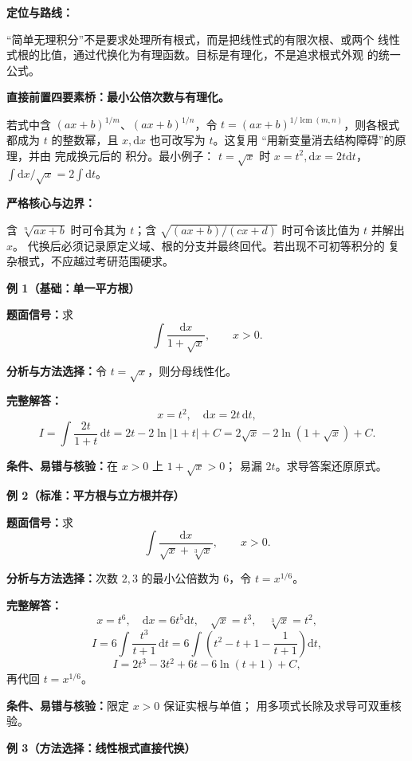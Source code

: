 \begin{knowledgeBox}
\textbf{定位与路线：}

“简单无理积分”不是要求处理所有根式，而是把线性式的有限次根、或两个
线性式根的比值，通过代换化为有理函数。目标是有理化，不是追求根式外观
的统一公式。

\textbf{直接前置四要素桥：最小公倍次数与有理化。}

若式中含 \((ax+b)^{1/m}\)、\((ax+b)^{1/n}\)，令
\(t=(ax+b)^{1/\operatorname{lcm}(m,n)}\)，则各根式都成为 \(t\)
的整数幂，且 \(x,\mathrm dx\) 也可改写为 \(t\)。这复用
“用新变量消去结构障碍”的原理，并由
完成换元后的
积分。最小例子：
\(t=\sqrt x\) 时 \(x=t^2,\mathrm dx=2t\mathrm dt\)，
\(\int\mathrm dx/\sqrt x=2\int\mathrm dt\)。

\textbf{严格核心与边界：}

含 \(\sqrt[n]{ax+b}\) 时可令其为 \(t\)；含
\(\sqrt{(ax+b)/(cx+d)}\) 时可令该比值为 \(t\) 并解出 \(x\)。
代换后必须记录原定义域、根的分支并最终回代。若出现不可初等积分的
复杂根式，不应越过考研范围硬求。

\textbf{例 1（基础：单一平方根）}

\textbf{题面信号：}求
\[
\int\frac{\mathrm dx}{1+\sqrt x},\qquad x>0.
\]

\textbf{分析与方法选择：}令 \(t=\sqrt x\)，则分母线性化。

\textbf{完整解答：}
\[
x=t^2,\quad \mathrm dx=2t\,\mathrm dt,
\]
\[
I=\int\frac{2t}{1+t}\,\mathrm dt
=2t-2\ln|1+t|+C
=2\sqrt x-2\ln(1+\sqrt x)+C.
\]

\textbf{条件、易错与核验：}在 \(x>0\) 上 \(1+\sqrt x>0\)；
易漏 \(2t\)。求导答案还原原式。

\textbf{例 2（标准：平方根与立方根并存）}

\textbf{题面信号：}求
\[
\int\frac{\mathrm dx}{\sqrt x+\sqrt[3]x},\qquad x>0.
\]

\textbf{分析与方法选择：}次数 \(2,3\) 的最小公倍数为 \(6\)，令
\(t=x^{1/6}\)。

\textbf{完整解答：}
\[
x=t^6,\quad \mathrm dx=6t^5\mathrm dt,\quad
\sqrt x=t^3,\quad\sqrt[3]x=t^2,
\]
\[
I=6\int\frac{t^3}{t+1}\,\mathrm dt
=6\int\left(t^2-t+1-\frac1{t+1}\right)\mathrm dt,
\]
\[
I=2t^3-3t^2+6t-6\ln(t+1)+C,
\]
再代回 \(t=x^{1/6}\)。

\textbf{条件、易错与核验：}限定 \(x>0\) 保证实根与单值；
用多项式长除及求导可双重核验。

\textbf{例 3（方法选择：线性根式直接代换）}


\end{knowledgeBox}
